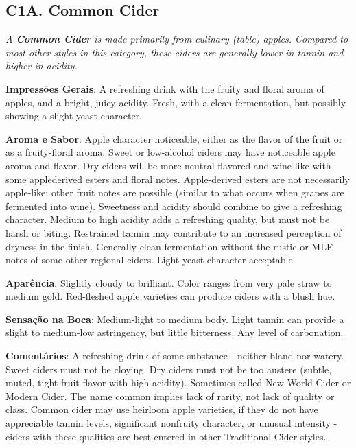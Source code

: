\subsection*{C1A. Common Cider}

\textit{A \textbf{Common Cider} is made primarily from culinary (table) apples. Compared to most other styles in this category, these ciders are generally lower in tannin and higher in acidity.}

\textbf{Impressões Gerais}: A refreshing drink with the fruity and floral aroma of apples, and a bright, juicy acidity. Fresh, with a clean fermentation, but possibly showing a slight yeast character.

\textbf{Aroma e Sabor}: Apple character noticeable, either as the flavor of the fruit or as a fruity-floral aroma. Sweet or low-alcohol ciders may have noticeable apple aroma and flavor. Dry ciders will be more neutral-flavored and wine-like with some applederived esters and floral notes. Apple-derived esters are not necessarily apple-like; other fruit notes are possible (similar to what occurs when grapes are fermented into wine). Sweetness and acidity should combine to give a refreshing character. Medium to high acidity adds a refreshing quality, but must not be harsh or biting. Restrained tannin may contribute to an increased perception of dryness in the finish. Generally clean fermentation without the rustic or MLF notes of some other regional ciders. Light yeast character acceptable.

\textbf{Aparência}: Slightly cloudy to brilliant. Color ranges from very pale straw to medium gold. Red-fleshed apple varieties can produce ciders with a blush hue.

\textbf{Sensação na Boca}: Medium-light to medium body. Light tannin can provide a slight to medium-low astringency, but little bitterness. Any level of carbonation.

\textbf{Comentários}: A refreshing drink of some substance - neither bland nor watery. Sweet ciders must not be cloying. Dry ciders must not be too austere (subtle, muted, tight fruit flavor with high acidity). Sometimes called New World Cider or Modern Cider. The name common implies lack of rarity, not lack of quality or class. Common cider may use heirloom apple varieties, if they do not have appreciable tannin levels, significant nonfruity character, or unusual intensity - ciders with these qualities are best entered in other Traditional Cider styles.

